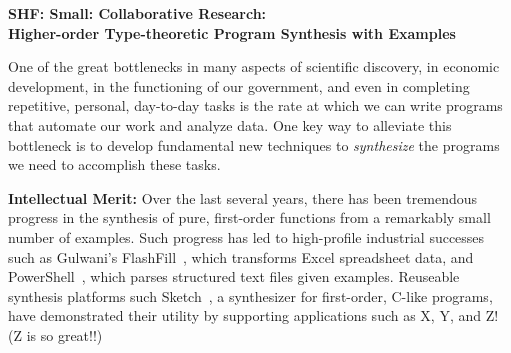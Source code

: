 



\begin{center}\large\bf
SHF: Small: Collaborative Research:  \\
Higher-order Type-theoretic Program Synthesis with Examples
\end{center}

One of the great bottlenecks in many aspects of scientific discovery, in 
economic development, in the functioning of our government, and even in 
completing repetitive, personal, day-to-day tasks is the rate at which
we can write programs that automate our work and analyze data.  
One key way to alleviate this
bottleneck is to develop fundamental new techniques to \textit{synthesize} the 
programs we need to accomplish these tasks.

\textbf{Intellectual Merit:}  Over the last several years, there has
been tremendous progress in the synthesis of pure, first-order
functions from a remarkably small number of examples.  Such progress
has led to high-profile industrial successes such as Gulwani's FlashFill~\cite{flashfill},
which transforms Excel spreadsheet data, and PowerShell~\cite{powershell},
which parses structured text files given examples.  
Reuseable synthesis platforms such 
Sketch~\cite{sketch}, a synthesizer for first-order, C-like programs, have
demonstrated their utility by supporting applications such as X, Y, and Z! 
(Z is so great!!)

